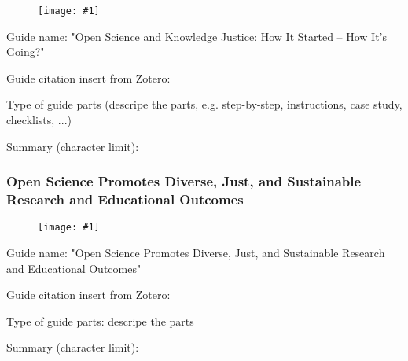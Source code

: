 \documentclass{article}
\newlength{\imgwidth}
\newcommand\scaledgraphics[2]{%
                
\settowidth{\imgwidth}{\texttt{[image: \#1]}}%
                
\setlength{\imgwidth}{\minof{\imgwidth}{#2\textwidth}}%
                
\texttt{[image: \#1]}%
                
}
\begin{document}
\begin{center}
\begin{figure}
\scaledgraphics{e590694e-3a8f-4a2f-801f-704d7d8edbc0.png}{0.5}
\label{F3873651}
\end{figure}


\end{center}





Guide name: "Open Science and Knowledge Justice: How It Started – How It’s Going?"


Guide citation insert from Zotero: \autocite{noauthor_open_2021}


Type of guide parts (descripe the parts, e.g. step-by-step, instructions, case study, checklists, ...)


Summary (character limit): 


\subsubsection{Open Science Promotes Diverse, Just, and Sustainable Research and Educational Outcomes}\label{H4807510}


\begin{figure}
\scaledgraphics{23f9ee73-dda2-4a56-8083-4a618f9983b9.png}{1}
\label{F46402811}
\end{figure}





Guide name: "Open Science Promotes Diverse, Just, and Sustainable Research and Educational Outcomes"


Guide citation insert from Zotero: \autocite{grahe_open_2019}


Type of guide parts: descripe the parts


Summary (character limit): 


\subsection{}\label{H7151279}



\printbibliography[title={Literaturverzeichnis}]
\end{document}
